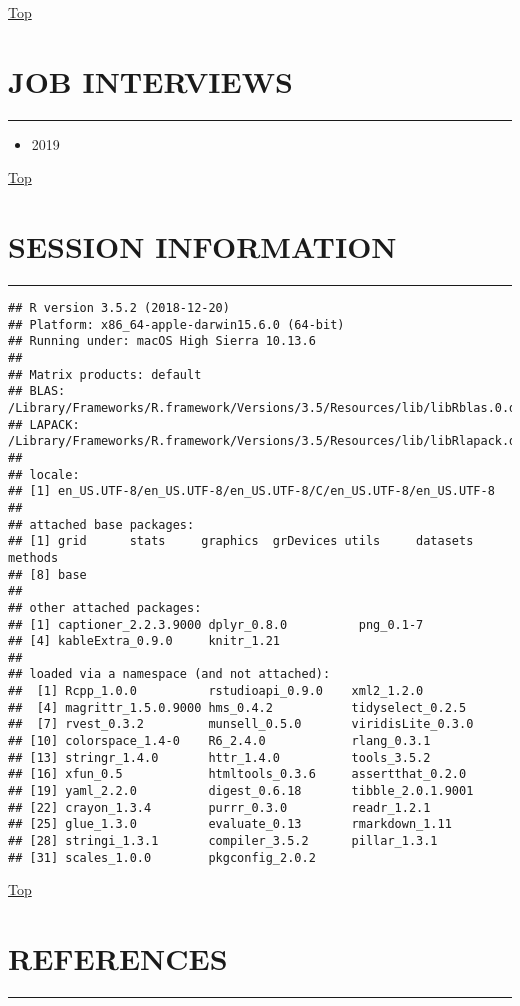 \documentclass[]{article}
\providecommand{\tightlist}{%
  \setlength{\itemsep}{0pt}\setlength{\parskip}{0pt}}
\begin{document}
\protect\hyperlink{Top}{Top}

\section{JOB INTERVIEWS}\label{job-interviews}

\begin{center}\rule{0.5\linewidth}{\linethickness}\end{center}

\begin{itemize}
\tightlist
\item
  2019
\end{itemize}

\protect\hyperlink{Top}{Top}

\section{SESSION INFORMATION}\label{session-information}

\begin{center}\rule{0.5\linewidth}{\linethickness}\end{center}

\begin{verbatim}
## R version 3.5.2 (2018-12-20)
## Platform: x86_64-apple-darwin15.6.0 (64-bit)
## Running under: macOS High Sierra 10.13.6
## 
## Matrix products: default
## BLAS: /Library/Frameworks/R.framework/Versions/3.5/Resources/lib/libRblas.0.dylib
## LAPACK: /Library/Frameworks/R.framework/Versions/3.5/Resources/lib/libRlapack.dylib
## 
## locale:
## [1] en_US.UTF-8/en_US.UTF-8/en_US.UTF-8/C/en_US.UTF-8/en_US.UTF-8
## 
## attached base packages:
## [1] grid      stats     graphics  grDevices utils     datasets  methods  
## [8] base     
## 
## other attached packages:
## [1] captioner_2.2.3.9000 dplyr_0.8.0          png_0.1-7           
## [4] kableExtra_0.9.0     knitr_1.21          
## 
## loaded via a namespace (and not attached):
##  [1] Rcpp_1.0.0          rstudioapi_0.9.0    xml2_1.2.0         
##  [4] magrittr_1.5.0.9000 hms_0.4.2           tidyselect_0.2.5   
##  [7] rvest_0.3.2         munsell_0.5.0       viridisLite_0.3.0  
## [10] colorspace_1.4-0    R6_2.4.0            rlang_0.3.1        
## [13] stringr_1.4.0       httr_1.4.0          tools_3.5.2        
## [16] xfun_0.5            htmltools_0.3.6     assertthat_0.2.0   
## [19] yaml_2.2.0          digest_0.6.18       tibble_2.0.1.9001  
## [22] crayon_1.3.4        purrr_0.3.0         readr_1.2.1        
## [25] glue_1.3.0          evaluate_0.13       rmarkdown_1.11     
## [28] stringi_1.3.1       compiler_3.5.2      pillar_1.3.1       
## [31] scales_1.0.0        pkgconfig_2.0.2
\end{verbatim}

\protect\hyperlink{Top}{Top}

\section{REFERENCES}\label{references}

\begin{center}\rule{0.5\linewidth}{\linethickness}\end{center}
\end{document}
